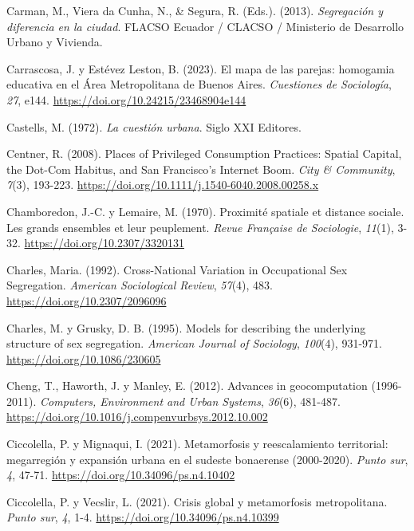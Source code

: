 \documentclass[
  spanish,
  a4paper,%
  chapterprefix=true,%
  DIV=calc,%
  twoside]{scrbook}%
\newlength{\cslhangindent}
\newenvironment{CSLReferences}[2] %
 {\begin{list}{}{%
  \setlength{\itemindent}{0pt}
  \setlength{\leftmargin}{0pt}
  \setlength{\parsep}{0pt}
  \ifodd #1
   \setlength{\leftmargin}{\cslhangindent}
   \setlength{\itemindent}{-1\cslhangindent}
  \fi
  \setlength{\itemsep}{#2\baselineskip}}}
 {\end{list}}
\begin{document}
\begin{CSLReferences}{1}{0}
Carman, M., Viera da Cunha, N., \& Segura, R. (Eds.). (2013). \emph{Segregación y diferencia en la ciudad}. FLACSO Ecuador / CLACSO / Ministerio de Desarrollo Urbano y Vivienda.

Carrascosa, J. y Estévez Leston, B. (2023). El mapa de las parejas: homogamia educativa en el Área Metropolitana de Buenos Aires. \emph{Cuestiones de Sociología}, \emph{27}, e144. \url{https://doi.org/10.24215/23468904e144}

Castells, M. (1972). \emph{La cuestión urbana}. Siglo XXI Editores.

Centner, R. (2008). Places of Privileged Consumption Practices: Spatial Capital, the Dot-Com Habitus, and San Francisco{'}s Internet Boom. \emph{City \& Community}, \emph{7}(3), 193-223. \url{https://doi.org/10.1111/j.1540-6040.2008.00258.x}

Chamboredon, J.-C. y Lemaire, M. (1970). Proximité spatiale et distance sociale. Les grands ensembles et leur peuplement. \emph{Revue Française de Sociologie}, \emph{11}(1), 3-32. \url{https://doi.org/10.2307/3320131}

Charles, Maria. (1992). Cross-National Variation in Occupational Sex Segregation. \emph{American Sociological Review}, \emph{57}(4), 483. \url{https://doi.org/10.2307/2096096}

Charles, M. y Grusky, D. B. (1995). Models for describing the underlying structure of sex segregation. \emph{American Journal of Sociology}, \emph{100}(4), 931-971. \url{https://doi.org/10.1086/230605}

Cheng, T., Haworth, J. y Manley, E. (2012). Advances in geocomputation (1996-2011). \emph{Computers, Environment and Urban Systems}, \emph{36}(6), 481-487. \url{https://doi.org/10.1016/j.compenvurbsys.2012.10.002}

Ciccolella, P. y Mignaqui, I. (2021). Metamorfosis y reescalamiento territorial: megarregión y expansión urbana en el sudeste bonaerense (2000-2020). \emph{Punto sur}, \emph{4}, 47-71. \url{https://doi.org/10.34096/ps.n4.10402}

Ciccolella, P. y Vecslir, L. (2021). Crisis global y metamorfosis metropolitana. \emph{Punto sur}, \emph{4}, 1-4. \url{https://doi.org/10.34096/ps.n4.10399}


\end{CSLReferences}
\end{document}

